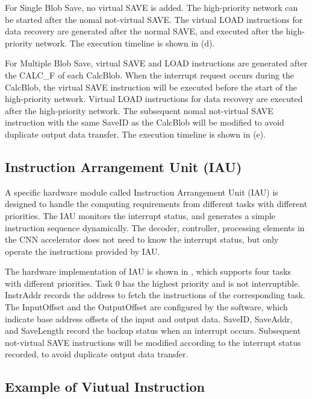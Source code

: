 For Single Blob Save, no virtual SAVE is added. The high-priority network can be started after the nomal not-virtual SAVE. The virtual LOAD instructions for data recovery are generated after the normal SAVE, and executed after the high-priority network. The execution timeline is shown in (d).

For Multiple Blob Save, virtual SAVE and LOAD instructions are generated after the CALC\_F of each CalcBlob. When the interrupt request occurs during the CalcBlob, the virtual SAVE instruction will be executed before the start of the high-priority network. Virtual LOAD instructions for data recovery are executed after the high-priority network. The subsequent nomal not-virtual SAVE instruction with the same SaveID as the CalcBlob will be modified to avoid duplicate output data transfer. The execution timeline is shown in (e).



\subsection{ Instruction Arrangement Unit (IAU) }

A specific hardware module called Instruction Arrangement Unit (IAU) is designed to handle the computing requirements from different tasks with different priorities. The IAU monitors the interrupt status, and generates a simple instruction sequence dynamically. The decoder, controller, processing elements in the CNN accelerator does not need to know the interrupt status, but only operate the instructions provided by IAU.

The hardware implementation of IAU is shown in , which supports four tasks with different priorities. Task 0 has the highest priority and is not interruptible. 
InstrAddr records the address to fetch the instructions of the corresponding task. The InputOffset and the OutputOffset are configured by the software, which indicate base address offsets of the input and output data. 
SaveID, SaveAddr, and SaveLength record the backup status when an interrupt occurs. 
Subsequent not-virtual SAVE instructions will be modified according to the interrupt status recorded, to avoid duplicate output data transfer.


\subsection{Example of Viutual Instruction}
\label{sec:exampleVirtual}


